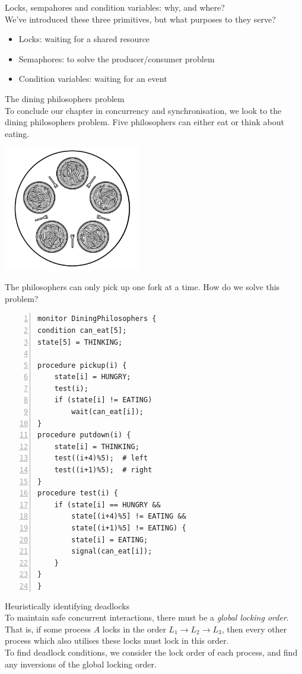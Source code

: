\documentclass[journal, letterpaper]{IEEEtran}
\begin{document}
\begin{aside}{Locks, sempahores and condition variables: why, and where?} \\ 
    We've introduced these three primitives, but what purposes to they serve?
    \begin{itemize}
        \item Locks: waiting for a shared resource
        \item Semaphores: to solve the producer/consumer problem
        \item Condition variables: waiting for an event
    \end{itemize}
\end{aside}
\begin{example}{The dining philosophers problem} \\
    To conclude our chapter in concurrency and synchronisation, we look to the dining philosophers problem. Five philosophers can either eat or think about eating.
    \begin{center}
        \includegraphics[width=6cm]{./photos/dining_philosophers.png}
    \end{center}
    The philosophers can only pick up one fork at a time. How do we solve this problem?
    \begin{Verbatim}[numbers=left, numbersep=2mm, frame=single]
monitor DiningPhilosophers {
condition can_eat[5];
state[5] = THINKING;

procedure pickup(i) {
    state[i] = HUNGRY;
    test(i);
    if (state[i] != EATING) 
        wait(can_eat[i]);
}
procedure putdown(i) {
    state[i] = THINKING;
    test((i+4)%5);  # left
    test((i+1)%5);  # right
}
procedure test(i) {
    if (state[i] == HUNGRY &&
        state[(i+4)%5] != EATING &&
        state[(i+1)%5] != EATING) {
        state[i] = EATING;
        signal(can_eat[i]);
    }
}
}
    \end{Verbatim}
\end{example}
\begin{aside}{Heuristically identifying deadlocks} \\
    To maintain safe concurrent interactions, there must be a \textit{global locking order}. That is, if some process $A$ locks in the order $L_1 \to L_2 \to L_3$, then every other process which also utilises these locks must lock in this order.
    \newline \\ To find deadlock conditions, we consider the lock order of each process, and find any inversions of the global locking order.
\end{aside}
\end{document}

